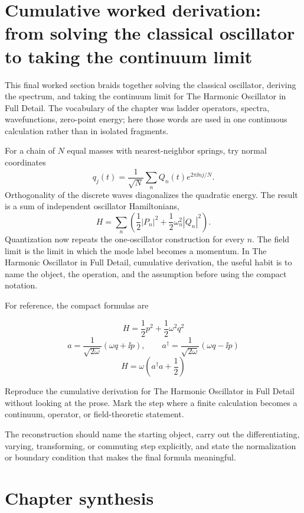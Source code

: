 \section{Cumulative worked derivation: from solving the classical oscillator to taking the continuum limit}

This final worked section braids together solving the classical oscillator, deriving the spectrum, and taking the continuum limit for The Harmonic Oscillator in Full Detail.  The vocabulary of the chapter was ladder operators, spectra, wavefunctions, zero-point energy; here those words are used in one continuous calculation rather than in isolated fragments.

For a chain of \(N\) equal masses with nearest-neighbor springs, try normal coordinates
\[
  q_j(t)=\frac1{\sqrt N}\sum_n Q_n(t)e^{2\pi\ii nj/N}.
\]
Orthogonality of the discrete waves diagonalizes the quadratic energy.  The result is a sum of independent oscillator Hamiltonians,
\[
  H=\sum_n\left(\frac12|P_n|^2+\frac12\omega_n^2|Q_n|^2\right).
\]
Quantization now repeats the one-oscillator construction for every \(n\).  The field limit is the limit in which the mode label becomes a momentum.  In The Harmonic Oscillator in Full Detail, cumulative derivation, the useful habit is to name the object, the operation, and the assumption before using the compact notation.

For reference, the compact formulas are

\[
  H=\frac12p^2+\frac12\omega^2q^2
\]
\[
  a=\frac{1}{\sqrt{2\omega}}(\omega q+\ii p),\qquad a^\dagger=\frac{1}{\sqrt{2\omega}}(\omega q-\ii p)
\]
\[
  H=\omega\left(a^\dagger a+\frac12\right)
\]

\begin{exercise}
Reproduce the cumulative derivation for The Harmonic Oscillator in Full Detail without looking at the prose.  Mark the step where a finite calculation becomes a continuum, operator, or field-theoretic statement.
\begin{answer}
The reconstruction should name the starting object, carry out the differentiating, varying, transforming, or commuting step explicitly, and state the normalization or boundary condition that makes the final formula meaningful.
\end{answer}
\end{exercise}



\section{Chapter synthesis}

